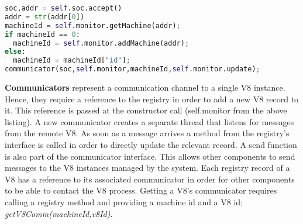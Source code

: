 \documentclass{l4proj}
\begin{document}
\begin{lstlisting}[language=python]
soc,addr = self.soc.accept()
addr = str(addr[0])
machineId = self.monitor.getMachine(addr);
if machineId == 0:
  machineId = self.monitor.addMachine(addr); 
else:
  machineId = machineId["id"];
communicator(soc,self.monitor,machineId,self.monitor.update);
\end{lstlisting}
\hspace*{3em} \textbf{Communicators} represent a communication channel to a single V8 instance. Hence, they require a reference to the registry in order to add a new V8 record to it. This reference is passed at the constructor call (self.monitor from the above listing). A new communicator creates a separate thread that listens for messages from the remote V8. As soon as a message arrives a method from the registry's interface is called in order to directly update the relevant record. A send function is also part of the communicator interface. This allows other components to send messages to the V8 instances managed by the system. Each registry record of a V8 has a reference to its associated communicator in order for other components to be able to contact the V8 process. Getting a V8's communicator requires calling a registry method and providing a machine id and a V8 id: \textit{getV8Comm(machineId,v8Id)}.
\end{document}

